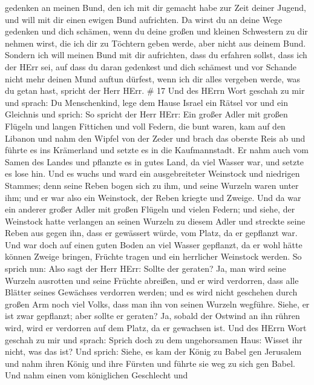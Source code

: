 gedenken an meinen Bund, den ich mit dir gemacht habe zur Zeit deiner
Jugend, und will mit dir einen ewigen Bund aufrichten.  Da
wirst du an deine Wege gedenken und dich schämen, wenn du deine großen
und kleinen Schwestern zu dir nehmen wirst, die ich dir zu Töchtern
geben werde, aber nicht aus deinem Bund.  Sondern ich will
meinen Bund mit dir aufrichten, dass du erfahren sollst, dass ich der
HErr sei,  auf dass du daran gedenkest und dich schämest
und vor Schande nicht mehr deinen Mund auftun dürfest, wenn ich dir
alles vergeben werde, was du getan hast, spricht der Herr HErr. \# 17
 Und des HErrn Wort geschah zu mir und sprach: 
Du Menschenkind, lege dem Hause Israel ein Rätsel vor und ein Gleichnis
 und sprich: So spricht der Herr HErr: Ein großer Adler mit
großen Flügeln und langen Fittichen und voll Federn, die bunt waren, kam
auf den Libanon und nahm den Wipfel von der Zeder  und brach
das oberste Reis ab und führte es ins Krämerland und setzte es in die
Kaufmannstadt.  Er nahm auch vom Samen des Landes und
pflanzte es in gutes Land, da viel Wasser war, und setzte es lose hin.
 Und es wuchs und ward ein ausgebreiteter Weinstock und
niedrigen Stammes; denn seine Reben bogen sich zu ihm, und seine Wurzeln
waren unter ihm; und er war also ein Weinstock, der Reben kriegte und
Zweige.  Und da war ein anderer großer Adler mit großen
Flügeln und vielen Federn; und siehe, der Weinstock hatte verlangen an
seinen Wurzeln zu diesem Adler und streckte seine Reben aus gegen ihn,
dass er gewässert würde, vom Platz, da er gepflanzt war. 
Und war doch auf einen guten Boden an viel Wasser gepflanzt, da er wohl
hätte können Zweige bringen, Früchte tragen und ein herrlicher Weinstock
werden.  So sprich nun: Also sagt der Herr HErr: Sollte der
geraten? Ja, man wird seine Wurzeln ausrotten und seine Früchte
abreißen, und er wird verdorren, dass alle Blätter seines Gewächses
verdorren werden; und es wird nicht geschehen durch großen Arm noch viel
Volks, dass man ihn von seinen Wurzeln wegführe.  Siehe, er
ist zwar gepflanzt; aber sollte er geraten? Ja, sobald der Ostwind an
ihn rühren wird, wird er verdorren auf dem Platz, da er gewachsen ist.
 Und des HErrn Wort geschah zu mir und sprach:
 Sprich doch zu dem ungehorsamen Haus: Wisset ihr nicht,
was das ist? Und sprich: Siehe, es kam der König zu Babel gen Jerusalem
und nahm ihren König und ihre Fürsten und führte sie weg zu sich gen
Babel.  Und nahm einen vom königlichen Geschlecht und
